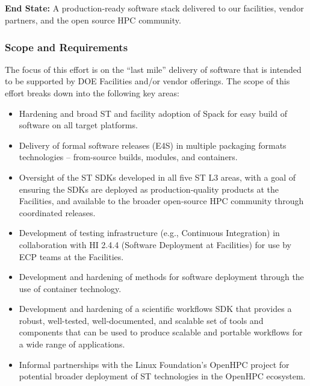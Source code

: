 \subsection{ \ecosystem}\label{subsect:ecosystem}

\textbf{End State:} A production-ready software stack delivered to our facilities, vendor partners, and the open source HPC community.

\subsubsection{Scope and Requirements}
The focus of this effort is on the ``last mile'' delivery of software that is intended to be supported by DOE Facilities and/or vendor offerings. The scope of this effort breaks down into the following key areas:
\begin{itemize}
	\item Hardening and broad ST and facility adoption of Spack for easy build of software on all target platforms.
        \item Delivery of formal software releases (E4S) in multiple packaging formats technologies -- from-source builds, modules, and containers.
	\item Oversight of the ST SDKs developed in all five ST L3 areas, with a goal of ensuring the SDKs are deployed as production-quality products at the Facilities, and available to the broader open-source HPC community through coordinated releases.
	\item Development of testing infrastructure (e.g., Continuous Integration) in collaboration with HI 2.4.4 (Software Deployment at Facilities) for use by ECP teams at the Facilities.
	\item Development and hardening of methods for software deployment through the use of container technology.
	\item Development and hardening of a scientific workflows SDK that provides a robust, well-tested, well-documented, and scalable set of tools and components that can be used to produce scalable and portable workflows for a wide range of applications.
	\item Informal partnerships with the Linux Foundation's OpenHPC project for potential broader deployment of ST technologies in the OpenHPC ecosystem.
\end{itemize}

